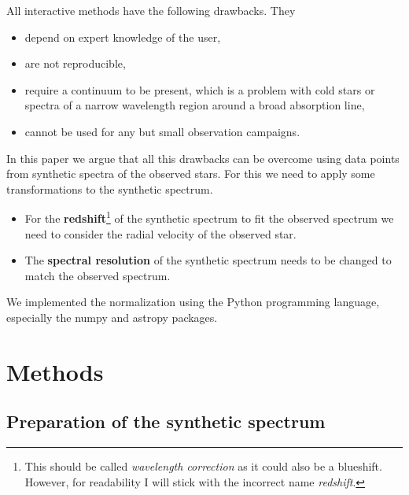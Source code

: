 \documentclass[10pt,a4paper,notitlepage,twocolumn]{article}
\begin{document}
All interactive methods have the following drawbacks. They
\begin{itemize} \itemsep -8pt
	\item depend on expert knowledge of the user,
	\item are not reproducible,
	\item require a continuum to be present, which is a problem with cold stars or spectra of a narrow wavelength region around a broad absorption line,
	\item cannot be used for any but small observation campaigns.
\end{itemize}

In this paper we argue that all this drawbacks can be overcome using data points from synthetic spectra of the observed stars.
For this we need to apply some transformations to the synthetic spectrum.
\begin{itemize} \itemsep -8pt
	\item For the {\bf redshift}\footnote{This should be called {\em wavelength correction} as it could also be a blueshift. However, for readability I will stick with the incorrect name {\em redshift}.}  of the synthetic spectrum to fit the observed spectrum we need to consider the radial velocity of the observed star.
	\item The {\bf spectral resolution} of the synthetic spectrum needs to be changed to match the observed spectrum.
\end{itemize}

We implemented the normalization using the Python programming language, especially the numpy \cite{numpy} and astropy \cite{astropy:2013} \cite{astropy:2018} packages.

\section{Methods}

\subsection{Preparation of the synthetic spectrum}
\end{document}
